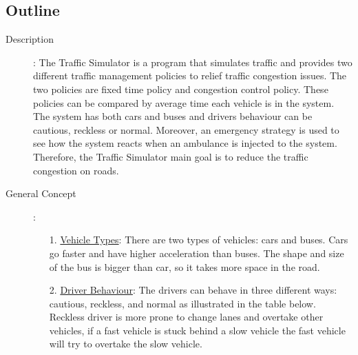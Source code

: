 \documentclass[11pt]{article}
\begin{document}
\subsection{Outline}
\begin{description}
\item[Description]:
The Traffic Simulator is a program that simulates traffic and provides two different traffic management policies to relief traffic congestion issues. The two policies are fixed time policy and congestion control policy. These policies can be compared by average time each vehicle is in the system. The system has both cars and buses and drivers behaviour can be cautious, reckless or normal. Moreover, an emergency strategy is used to see how the system reacts when an ambulance is injected to the system. Therefore, the Traffic Simulator main goal is to reduce the traffic congestion on roads. 
\item[General Concept]:
	\begin{itemize}
		\item[1. ]\underline{Vehicle Types}: There are two types of vehicles: cars and buses. Cars go faster and have higher acceleration than buses. The shape and size of the bus is bigger than car, so it takes more space in the road.
		
		\item[2. ] \underline{Driver Behaviour}: The drivers can behave in three different ways: cautious, reckless, and normal as illustrated in the table below. Reckless driver is more prone to change lanes and overtake other vehicles, if a fast vehicle is stuck behind a slow vehicle the fast vehicle will try to overtake the slow vehicle.


\end{itemize}
\end{description}
\end{document}

